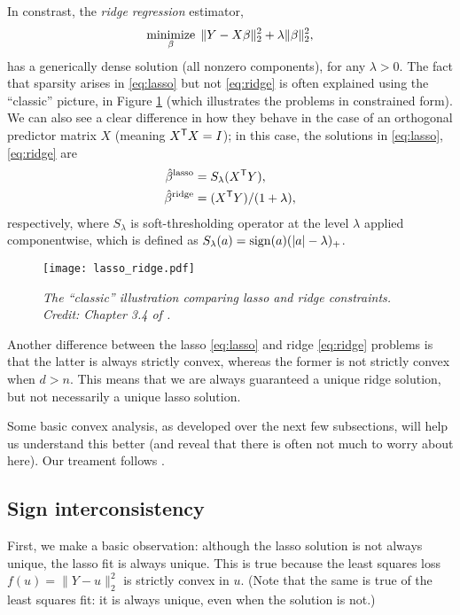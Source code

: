 \documentclass{article}
\begin{document}
In constrast, the \emph{ridge regression} estimator, 
\begin{equation}
\label{eq:ridge}
\operatorname*{minimize}_\beta \; \|Y - X\beta\|_2^2 + \lambda \|\beta\|_2^2, 
\end{equation}
has a generically dense solution (all nonzero components), for any $\lambda >
0$. The fact that sparsity arises in \eqref{eq:lasso} but not \eqref{eq:ridge}
is often explained using the ``classic'' picture, in Figure
\ref{fig:lasso_ridge} (which illustrates the problems in constrained form). We
can also see a clear difference in how they behave in the case of an orthogonal
predictor matrix $X$ (meaning $X^{\mathsf{T}} X = I$); in this case, the solutions in
\eqref{eq:lasso}, \eqref{eq:ridge} are  
\begin{align*}
\hat{\beta}^{\text{lasso}} &= S_\lambda(X^{\mathsf{T}} Y), \\
\hat{\beta}^{\text{ridge}} &= (X^{\mathsf{T}} Y) / (1+\lambda),
\end{align*}
respectively, where $S_\lambda$ is soft-thresholding operator at the level
$\lambda$ applied componentwise, which is defined as $S_\lambda(a) = \operatorname{sign}(a)
(|a| - \lambda)_+$.  

\begin{figure}[htb]
\centering
\texttt{[image: lasso\_ridge.pdf]}
\caption{\it The ``classic'' illustration comparing lasso and ridge
  constraints. Credit: Chapter 3.4 of \citet{hastie2009elements}.}  
\label{fig:lasso_ridge}
\end{figure}

Another difference between the lasso \eqref{eq:lasso} and ridge \eqref{eq:ridge}
problems is that the latter is always strictly convex, whereas the former is not
strictly convex when $d>n$. This means that we are always guaranteed a unique
ridge solution, but not necessarily a unique lasso solution.   

Some basic convex analysis, as developed over the next few subsections, will
help us understand this better (and reveal that there is often not much to worry
about here). Our treament follows \citet{tibshirani2013lasso}.

\subsection{Sign interconsistency}

First, we make a basic observation: although the lasso solution is not always 
unique, the lasso fit  is always unique. This is true because 
the least squares loss $f(u) = \|Y - u\|_2^2$ is strictly convex in $u$. (Note
that the same is true of the least squares fit: it is always unique, even when
the solution is not.)
\end{document}

